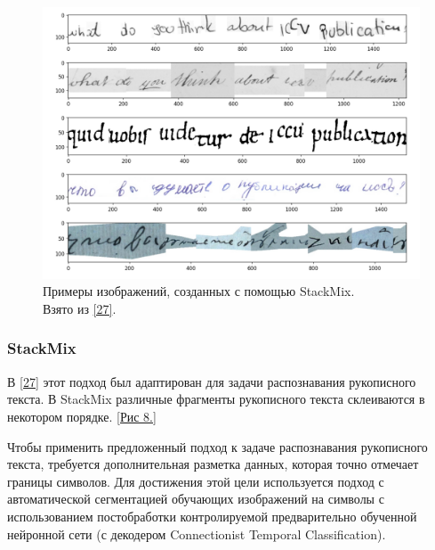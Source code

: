 \begin{figure}
    \centering
    \includegraphics[scale=0.25]{./images/stackmix.png}
    \caption{\protect\hypertarget{image8}{Примеры изображений, созданных с помощью StackMix. \\ Взято из \protect\hyperlink{cite.Sho21}{[27]}.}}
\end{figure}

\subsubsection{StackMix}
В \hyperlink{cite.Sho21}{[27]} этот подход был адаптирован для задачи распознавания рукописного текста. В StackMix различные фрагменты рукописного текста склеиваются в некотором порядке. \hyperlink{image8}{[Рис 8.]}

Чтобы применить предложенный подход к задаче распознавания рукописного текста, требуется дополнительная разметка данных, которая точно отмечает границы символов. Для достижения этой цели используется подход с автоматической сегментацией обучающих изображений на символы с использованием постобработки контролируемой предварительно обученной нейронной сети (с декодером Connectionist Temporal Classification). 

